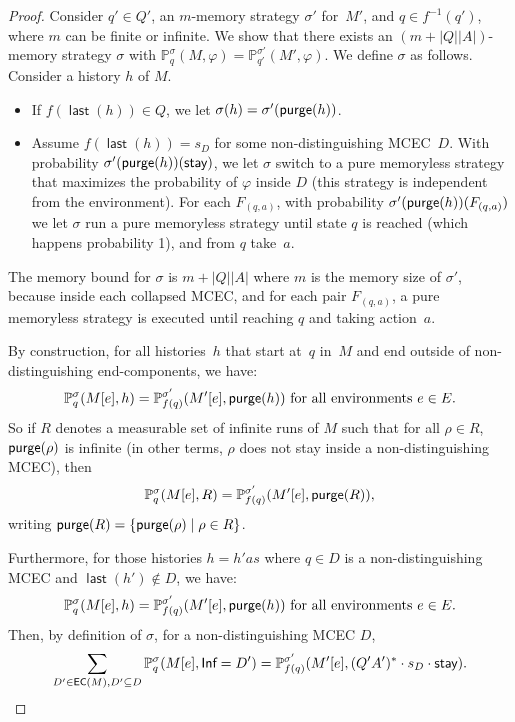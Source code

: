 \documentclass[a4paper,USenglish,cleveref, autoref, thm-restate]{lipics-v2021}
\def\abs#1{\ensuremath{\lvert #1 \rvert}}
\newcommand*{\pr}{\mathbb{P}}
\newcommand\ecs{\textrm{\sf EC}}
\newcommand\Inf{\textrm{\sf Inf}}
\newcommand{\last}{\operatorname{\mathsf{last}}}
\def\Act{A}
\newcommand\freshaction[1]{F_{#1}}
\newcommand\purge[1]{\textrm{\sf purge}(#1)}
\def\actionstay{\textrm{\sf stay}}
\begin{document}
\begin{proof}
  Consider $q'\in Q'$, an $m$-memory strategy $\sigma'$ for~$M'$, and $q \in f^{-1}(q')$,
  where $m$ can be finite or infinite.
  We show that there exists an $(m+\abs{Q}\abs{\Act})$-memory strategy $\sigma$ with $\pr_{q}^\sigma(M,\varphi) = \pr_{q'}^{\sigma'}(M',\varphi)$.
  We define $\sigma$ as follows. Consider a history $h$ of $M$.
  \begin{itemize}
    \item If $f(\last(h)) \in Q$, we let $\sigma(h) = \sigma'(\purge{h})$.
    \item Assume $f(\last(h)) = s_D$ for some non-distinguishing MCEC~$D$. 
    With probability $\sigma'(\purge{h})(\actionstay)$, we let $\sigma$ switch to a pure memoryless strategy that maximizes the probability 
    of $\varphi$ inside $D$ (this strategy is independent from the environment).    
    For each $\freshaction{(q,a)}$,
    with probability $\sigma'(\purge{h})(\freshaction{(q,a)})$ we let $\sigma$ run a pure memoryless strategy until state $q$ is reached (which happens probability 1), 
    and from $q$ take~$a$.
  \end{itemize}
  The memory bound for $\sigma$ is $m+\abs{Q}\abs{\Act}$ where $m$ is the memory size of $\sigma'$, because inside each collapsed MCEC,
  and for each pair $\freshaction{(q,a)}$, a pure memoryless strategy is executed until reaching $q$ and taking action~$a$.

  By construction, for all histories~$h$ that start at~$q$ in~$M$ and end outside of non-distinguishing end-components, 
  we have:
  \begin{equation}
    \pr_{q}^{\sigma}(M[e], h) = \pr_{f(q)}^{\sigma'}(M'[e], \purge{h}) \text{ for all environments } e \in E.
  \end{equation}
  So if $R$ denotes a measurable set of infinite runs of $M$ such that for all $\rho \in R$, $\purge{\rho}$ is infinite 
  (in other terms, $\rho$ does not stay inside a non-distinguishing MCEC), then 
  \begin{equation}
    \label{eqn:same-prob-R-M-M'}
    \pr_q^\sigma(M[e], R) = \pr_{f(q)}^{\sigma'}(M'[e], \purge{R}),
  \end{equation}
  writing $\purge{R} = \{\purge{\rho} \mid \rho \in R\}$.

  Furthermore, for those histories $h=h'as$ where $q \in D$ is a non-distinguishing MCEC and $\last(h') \not \in D$, we have:
  \[
    \pr_{q}^{\sigma}(M[e], h) = \pr_{f(q)}^{\sigma'}(M'[e], \purge{h}) \text{ for all environments } e \in E.
  \]
  Then, by definition of $\sigma$, for a non-distinguishing MCEC $D$,
  \begin{equation}
    \label{eqn:same-prob-ndmcec}
    \sum_{D' \in \ecs(M), D'\subseteq D}\pr_q^\sigma(M[e], \Inf=D') = \pr_{f(q)}^{\sigma'}(M'[e], (Q'A')^*\cdot s_D \cdot \actionstay).
  \end{equation}


\end{proof}
\end{document}

